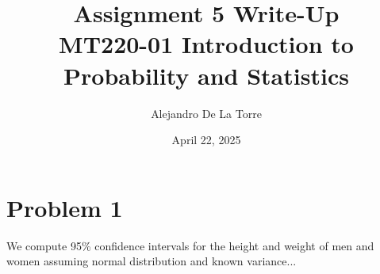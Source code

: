 \documentclass[12pt]{article}
\title{Assignment 5 Write-Up \\ MT220-01 Introduction to Probability and Statistics}
\author{Alejandro De La Torre}
\date{April 22, 2025}
\begin{document}
\maketitle

\section*{Problem 1}

We compute 95\% confidence intervals for the height and weight of men and women assuming normal distribution and known variance...

\end{document}
